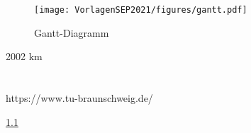 %
%
%
\begin{figure}[ht]
\centering
\texttt{[image: VorlagenSEP2021/figures/gantt.pdf]}
\caption{Gantt-Diagramm}
\label{gantt}
\end{figure}

2002 km

\section{}
\subsection{}

https://www.tu-braunschweig.de/

\ref{}
